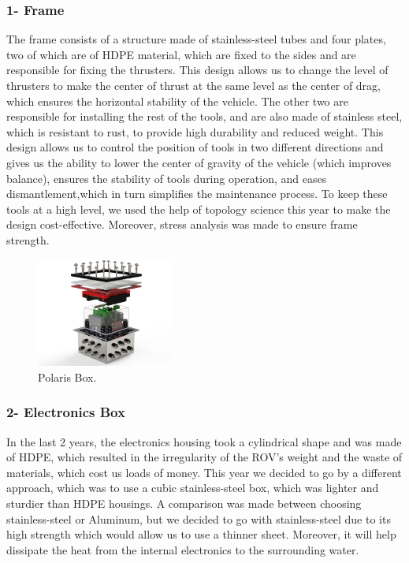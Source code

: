 \documentclass[a4paper,12pt,leqno]{report}
\begin{document}
\textcolor{orange!60}{
\subsubsection{1- Frame}}
The frame consists of a structure made of stainless-steel tubes and  four plates, two of which are of HDPE material, which are fixed to  the sides and are responsible for fixing the thrusters. This design  allows us to change the level of  thrusters to make the center of  thrust at the same level as the center of drag, which ensures the  horizontal stability of the vehicle. The other two are responsible for  installing the rest of the tools, and are also made of stainless steel,  which is resistant to rust, to provide high durability and reduced weight. This design allows us to control the position of  tools in  two different directions and gives us the ability to lower the center  of gravity of the vehicle (which improves balance), ensures the  stability of  tools during operation, and eases dismantlement,which in turn simplifies the maintenance process. To keep these tools at a high level, we  used the help of topology science this year to make the design cost-effective. Moreover, stress analysis was made to ensure frame strength.\\
\begin{figure}
	\centering
	\includegraphics[width = 0.4\textwidth,height= .2\textheight]{box23 (10)_Camera_SOLIDWORKS Viewport}
	\caption{Polaris Box.}
\end{figure}
\textcolor{orange!60}{
\subsubsection{2- Electronics Box}}	
In the last 2 years, the electronics housing took a cylindrical shape and was made of HDPE, which resulted in the irregularity of the ROV’s weight and the waste of materials, which cost us loads of  money. This year we decided to go by a different approach, which was to use a cubic stainless-steel box, which was lighter and sturdier than HDPE housings. A comparison was made between choosing stainless-steel or Aluminum, but we decided to go with stainless-steel due to its high strength which would allow us to use a thinner sheet. Moreover, it will help dissipate the heat from the internal electronics to the surrounding water.\\
\end{document}
